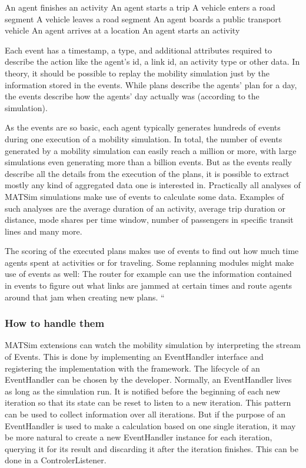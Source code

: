     An agent finishes an activity
    An agent starts a trip
    A vehicle enters a road segment
    A vehicle leaves a road segment
    An agent boards a public transport vehicle
    An agent arrives at a location
    An agent starts an activity

Each event has a timestamp, a type, and additional attributes required to describe the action like the agent's id, a link id, an activity type or other data. In theory, it should be possible to replay the mobility simulation just by the information stored in the events. While plans describe the agents' plan for a day, the events describe how the agents' day actually was (according to the simulation).

As the events are so basic, each agent typically generates hundreds of events during one execution of a mobility simulation. In total, the number of events generated by a mobility simulation can easily reach a million or more, with large simulations even generating more than a billion events. But as the events really describe all the details from the execution of the plans, it is possible to extract mostly any kind of aggregated data one is interested in. Practically all analyses of MATSim simulations make use of events to calculate some data. Examples of such analyses are the average duration of an activity, average trip duration or distance, mode shares per time window, number of passengers in specific transit lines and many more.

The scoring of the executed plans makes use of events to find out how much time agents spent at activities or for traveling. Some replanning modules might make use of events as well: The router for example can use the information contained in events to figure out what links are jammed at certain times and route agents around that jam when creating new plans.
``

\subsubsection{How to handle them}
MATSim extensions can watch the mobility simulation by interpreting the stream of Events. This is done
by implementing an EventHandler interface and registering the implementation with the framework. The lifecycle of
an EventHandler can be chosen by the developer. Normally, an EventHandler lives as long as the simulation run.
It is notified before the beginning of each new iteration so that its state can be reset to listen to a new
iteration. This pattern can be used to collect information over all iterations. But if the purpose of
an EventHandler is used to make a calculation based on one single iteration, it may be more natural
to create a new EventHandler instance for each iteration, querying it for its result and discarding it
after the iteration finishes. This can be done in a ControlerListener.
